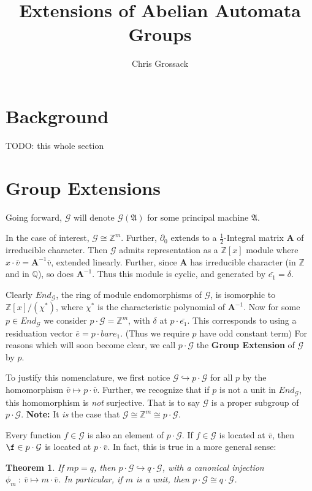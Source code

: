 \documentclass[12]{article}
\title{Extensions of Abelian Automata Groups}
\author{Chris Grossack}
\newcommand{\G}{\mathcal{G}}
\renewcommand{\P}{\mathfrak{A}}
\newcommand{\Z}{\mathbb{Z}}
\newcommand{\Q}{\mathbb{Q}}
\newcommand{\2}{\textbf{2}}
\newcommand{\Am}{\textbf{A}}
\newcommand{\del}{\partial}
\newcommand{\v}{\bar{v}}
\newtheorem{thm}{Theorem}
\begin{document}
\maketitle

\section{Background}
TODO: this whole section

\section{Group Extensions}
Going forward, $\G$ will denote $\G(\P)$ for some principal machine $\P$.

In the case of interest, $\G \cong \Z^m$. Further, $\del_0$ extends to 
a $\frac{1}{2}$-Integral matrix $\Am$ of irreducible character. Then
$\G$ admits representation as a $\Z[x]$ module where 
$x \cdot \v = \Am^{-1}\v$, extended linearly.
Further, since $\Am$ has irreducible character (in $\Z$ and in $\Q$), 
so does $\Am^{-1}$. Thus this module is cyclic, 
and generated by $\bar{e_1} = \delta$.

Clearly $End_{\G}$, the ring of module endomorphisms of $\G$, 
is isomorphic to $\Z[x]/(\chi^*)$, 
where $\chi^*$ is the characteristic polynomial of $\Am^{-1}$.
Now for some $p \in End_{\G}$ we consider
$p \cdot \G = \Z^m$, with $\delta$ at $p \cdot \bar{e_1}$.
This corresponds to using a residuation vector $\bar{e} = p \cdot bar{e_1}$.
(Thus we require $p$ have odd constant term)
For reasons which will soon become clear, we call $p \cdot \G$ the
\textbf{Group Extension} of $\G$ by $p$.

To justify this nomenclature, we first notice 
$\G \hookrightarrow p \cdot \G$ for all $p$ by the
homomorphism $\v \mapsto p \cdot \v$. 
Further, we recognize that if $p$ is not a unit in $End_{\G}$, 
this homomorphism is \emph{not} surjective. 
That is to say $\G$ is a proper subgroup of $p \cdot \G$.
\textbf{Note:} It \emph{is} the case that $\G \cong \Z^m \cong p \cdot \G$. 

Every function $f \in \G$ is also an element of $p \cdot \G$. 
If $f \in \G$ is located at $\v$, then $\f \in p \cdot \G$ is located
at $p \cdot \v$. In fact, this is true in a more general sense:

\begin{thm}
  If $mp = q$, then $p \cdot \G \hookrightarrow q \cdot \G$, 
  with a canonical injection $\phi_m~:~\v \mapsto m \cdot \v$. 
  In particular, if $m$ is a unit, then $p \cdot \G \cong q \cdot \G$.
\end{thm}
\end{document}
